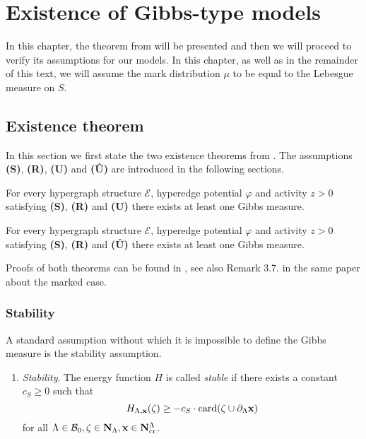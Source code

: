 \chapter{Existence of Gibbs-type models}\label{ch:3}
In this chapter, the theorem from \cite{DDG12} will be presented and then we will proceed to verify its assumptions for our models. In this chapter, as well as in the remainder of this text, we will assume  the mark distribution $\mu$ to be equal to the Lebesgue measure on $S$.

\section{Existence theorem}
In this section we first state the two existence theorems from \cite{DDG12}. The assumptions  \textbf{(S)}, \textbf{(R)}, \textbf{(U)} and \textbf{(\^U)} are introduced in the following sections. 

\begin{theorem}
	For every hypergraph structure $\mathcal E$, hyperedge potential $\varphi$ and activity $z>0$ satisfying \textbf{(S)}, \textbf{(R)} and \textbf{(U)} there exists at least one Gibbs measure.
\end{theorem}

\begin{theorem}
	For every hypergraph structure $\mathcal E$, hyperedge potential $\varphi$ and activity $z>0$ satisfying \textbf{(S)}, \textbf{(R)} and \textbf{(\^{U})} there exists at least one Gibbs measure.
\end{theorem}

Proofs of both theorems can be found in \cite{DDG12}, see also Remark 3.7. in the same paper about the marked case.

\subsection{Stability}\label{sec:stability}
A standard assumption without which it is impossible to define the Gibbs measure is the stability assumption. 

\begin{enumerate}[\textbf{(S)}] 
	\item \textit{Stability}. The energy function $H$ is called \textit{stable} if there exists a constant $c_S \geq 0$ such that 
		$$H_{\Lambda,{\mathbf{x}}}(\zeta) \geq -c_S \cdot \mathrm{card}(\zeta \cup \partial_\Lambda {\mathbf{x}})$$
for all $\Lambda \in \mathcal B_0, \zeta \in \mathbf N_\Lambda, {\mathbf{x}} \in \mathbf N^\Lambda_{\text{cr}}$.
\end{enumerate}


